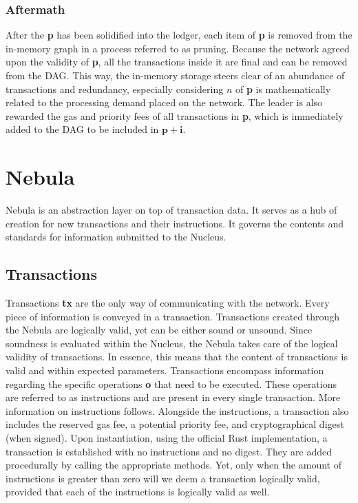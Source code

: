 \documentclass[letterpaper, 12pt]{article}
\begin{document}
\subsubsection{Aftermath}

After the \textbf{p} has been solidified into the ledger, each item of \textbf{p} is removed from the in-memory graph in a process referred to as pruning. Because the network agreed upon the validity of \textbf{p}, all the transactions inside it are final and can be removed from the DAG. This way, the in-memory storage steers clear of an abundance of transactions and redundancy, especially considering \(n\) of \textbf{p} is mathematically related to the processing demand placed on the network. The leader is also rewarded the gas and priority fees of all transactions in \textbf{p}, which is immediately added to the DAG to be included in $\mathbf{p+i}$.

\section{Nebula}

Nebula is an abstraction layer on top of transaction data. It serves as a hub of creation for new transactions and their instructions. It governs the contents and standards for information submitted to the Nucleus.

\subsection{Transactions}

Transactions \textbf{tx} are the only way of communicating with the network. Every piece of information is conveyed in a transaction. Transactions created through the Nebula are logically valid, yet can be either sound or unsound. Since soundness is evaluated within the Nucleus, the Nebula takes care of the logical validity of transactions. In essence, this means that the content of transactions is valid and within expected parameters.
Transactions encompass information regarding the specific operations \textbf{o} that need to be executed. These operations are referred to as instructions and are present in every single transaction. More information on instructions follows. Alongside the instructions, a transaction also includes the reserved gas fee, a potential priority fee, and cryptographical digest (when signed). Upon instantiation, using the official Rust implementation, a transaction is established with no instructions and no digest. They are added procedurally by calling the appropriate methods. Yet, only when the amount of instructions is greater than zero will we deem a transaction logically valid, provided that each of the instructions is logically valid as well.
\end{document}
